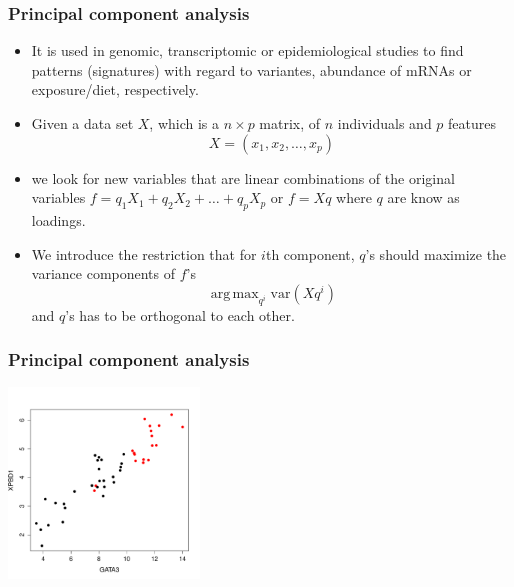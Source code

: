 \documentclass[10pt,xcolor=dvipsnames]{beamer}\usepackage[]{graphicx}\usepackage[]{color}
\newenvironment{knitrout}{}{} %
\DeclareMathOperator{\argmax}{arg\,max}
\begin{document}
\begin{frame}[plain]\frametitle{Principal component analysis}

\begin{itemize}
\item It is used in genomic, transcriptomic or epidemiological studies to find patterns (signatures) with regard to variantes, abundance of mRNAs or exposure/diet, respectively.
\item Given a data set $X$, which is a $n \times p$ matrix, of $n$ individuals and $p$ features
$$ X=(x_1, x_2, \ldots, x_p)$$ 
  \item we look for new variables that are linear combinations of the original variables
$f=q_1X_1 + q_2X_2 + \ldots + q_pX_p$  or $f=Xq$ where $q$ are know as loadings.
\item We introduce the restriction that for $i$th component, $q$'s should maximize the variance components of $f$'s
$$ \argmax_{q^i} \text{var}(Xq^i)$$ and $q$'s has to be orthogonal to each other.
\end{itemize}

\end{frame}

\begin{frame}\frametitle{Principal component analysis}

\begin{knitrout}\footnotesize
{}\color{fgcolor}

{\centering \includegraphics[width=2in]{figure/plot_pca_1-1} 

}



\end{knitrout}

\end{frame}
\end{document}
